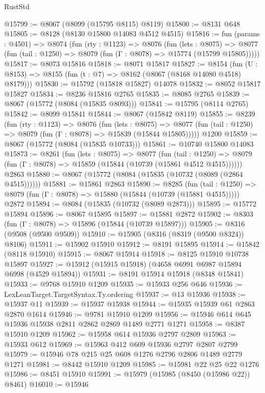 \begin{lexlean}{RustStd}
\begin{coremodule}
@15799 := @8067 (@8099 (@15795 @8115) @8119)
@15800 := @8131 @648
@15805 := @8128 (@8130 @15800 @14083 @4512 @4515)
@15816 := fun (params : @4501) =>
  @8074
    (fun (rty : @1123) =>
    @8076
      (fun (lets : @8075) =>
      @8077 (fun (tail : @1250) => @8079 (fun (Γ : @8078) => @15774 (@15799 @15805)))))
@15817 := @8073 @15816
@15818 := @8071 @15817
@15827 := @8154
    (fun (U : @8153) => @8155 (fun (t : @7) => @8162 (@8067 (@8168 @14080 @4518) @8179)))
@15830 := @15792 (@15818 @15827) @14078
@15832 := @8052 @15817 @15827
@15834 := @8236 @15816 @2765
@15835 := @8085 @2765
@15839 := @8067 (@15772 (@8084 (@15835 @8093)))
@15841 := @15795 (@8114 @2765)
@15842 := @8099 @15841
@15844 := @8067 (@15842 @8119)
@15855 := @8239
    (fun (rty : @1123) =>
    @8076
      (fun (lets : @8075) =>
      @8077 (fun (tail : @1250) => @8079 (fun (Γ : @8078) => @15839 (@15844 @15805)))))
    @1200
@15859 := @8067 (@15772 (@8084 (@15835 @10733)))
@15861 := @10740 @15800 @14083
@15873 := @8261
    (fun (lets : @8075) =>
    @8077
      (fun (tail : @1250) =>
      @8079 (fun (Γ : @8078) => @15859 (@15844 (@10739 (@15861 @4512 @4515))))))
    @2863
@15880 := @8067 (@15772 (@8084 (@15835 (@10732 (@8089 (@2864 @4515))))))
@15881 := @15861 @2863
@15890 := @8285
    (fun (tail : @1250) => @8079 (fun (Γ : @8078) => @15880 (@15844 (@10739 (@15881 @4515)))))
    @2872
@15894 := @8084 (@15835 (@10732 (@8089 @2873)))
@15895 := @15772 @15894
@15896 := @8067 @15895
@15897 := @15881 @2872
@15902 := @8303 (fun (Γ : @8078) => @15896 (@15844 (@10739 @15897)))
@15905 := @8316 (@9508 (@9500 @9509))
@15910 := @15905 (@8316 (@8319 (@9500 @8324)) @8106)
@15911 := @15902 @15910
@15912 := @8191 @15895
@15914 := @15842 (@8118 @15910)
@15915 := @8067 @15914
@15918 := @8125 @15910 @10738 @15897
@15927 := @15912 (@15915 @15918) (@4658 @6991 @6987 @15894 @6998 (@4529 @15894))
@15931 := @8191 @15914 @15918 (@8348 @15841)
@15933 := @9768 @15910 @1209
@15935 := @15933 @256 @646
@15936 := LexLeanTarget.TargetSyntax.Ty.ordering
@15937 := @13 @15936
@15938 := @15937 @11
@15939 := @15937 @15938
@15944 := @15935 @15939 @61 @2863 @2870 @1614
@15946 := @9781 @15910 @1209
@15956 := @15946 @614 @645 @15936 @15938 @2811 @2862 @2869 @1489 @2771 @1271
@15958 := @8387 @15910 @1209
@15962 := @15958 @614 @15936 @2797 @2809
@15963 := @15933 @612
@15969 := @15963 @412 @609 @15936 @2797 @2807 @2799
@15979 := @15946 @78 @215 @25 @608 @1276 @2796 @2806 @1489 @2779 @1271
@15981 := @8442 @15910 @1209
@15985 := @15981 @22 @25 @22 @1276
@15986 := @8451 @15910
@15991 := @15979 (@15985 (@8450 (@15986 @22)) @8461)
@16010 := @15946

\end{coremodule}
\end{lexlean}
